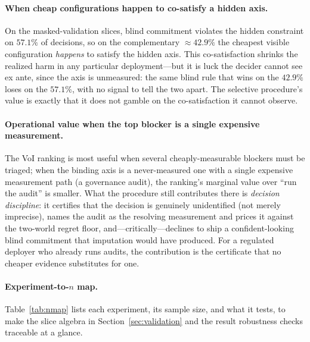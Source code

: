 \documentclass{article} %
\begin{document}
\paragraph{When cheap configurations happen to co-satisfy a hidden axis.}
On the masked-validation slices, blind commitment violates the hidden constraint on $57.1\%$ of decisions, so on the complementary $\approx 42.9\%$ the cheapest visible configuration \emph{happens} to satisfy the hidden axis. This co-satisfaction shrinks the realized harm in any particular deployment---but it is luck the decider cannot see ex ante, since the axis is unmeasured: the same blind rule that wins on the $42.9\%$ loses on the $57.1\%$, with no signal to tell the two apart. The selective procedure's value is exactly that it does not gamble on the co-satisfaction it cannot observe.

\paragraph{Operational value when the top blocker is a single expensive measurement.}
The VoI ranking is most useful when several cheaply-measurable blockers must be triaged; when the binding axis is a never-measured one with a single expensive measurement path (a governance audit), the ranking's marginal value over ``run the audit'' is smaller. What the procedure still contributes there is \emph{decision discipline}: it certifies that the decision is genuinely unidentified (not merely imprecise), names the audit as the resolving measurement and prices it against the two-world regret floor, and---critically---declines to ship a confident-looking blind commitment that imputation would have produced. For a regulated deployer who already runs audits, the contribution is the certificate that no cheaper evidence substitutes for one.

\paragraph{Experiment-to-$n$ map.}
Table~\ref{tab:nmap} lists each experiment, its sample size, and what it tests, to make the slice algebra in Section~\ref{sec:validation} and the result robustness checks traceable at a glance.
\end{document}
